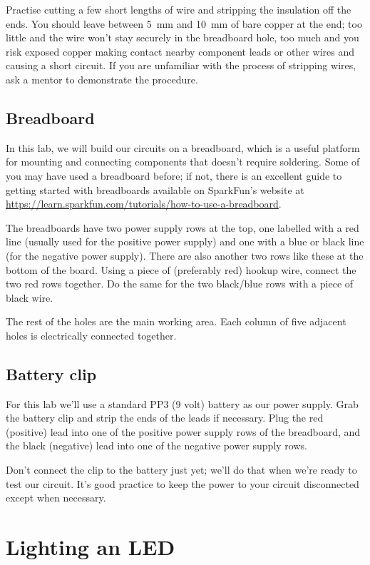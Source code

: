 \documentclass{article}
\begin{document}
Practise cutting a few short lengths of wire and stripping the insulation off
the ends. You should leave between \SI{5}{\milli\metre} and
\SI{10}{\milli\metre} of bare copper at the end; too little and the wire won't
stay securely in the breadboard hole, too much and you risk exposed copper
making contact nearby component leads or other wires and causing a short
circuit. If you are unfamiliar with the process of stripping wires, ask a
mentor to demonstrate the procedure.

\subsection{Breadboard}

In this lab, we will build our circuits on a breadboard, which is a useful
platform for mounting and connecting components that doesn't require soldering.
Some of you may have used a breadboard before; if not, there is an excellent
guide to getting started with breadboards available on SparkFun's website at
\url{https://learn.sparkfun.com/tutorials/how-to-use-a-breadboard}.

The breadboards have two power supply rows at the top, one labelled with
a red line (usually used for the positive power supply) and one with a blue or
black line (for the negative power supply). There are also another two
rows like these at the bottom of the board. Using a piece of (preferably red)
hookup wire, connect the two red rows together. Do the same for the two
black/blue rows with a piece of black wire.

The rest of the holes are the main working area. Each column of five adjacent
holes is electrically connected together.

\subsection{Battery clip}

For this lab we'll use a standard PP3 (9 volt) battery as our power supply.
Grab the battery clip and strip the ends of the leads if necessary. Plug the
red (positive) lead into one of the positive power supply rows of the
breadboard, and the black (negative) lead into one of the negative power supply
rows.

Don't connect the clip to the battery just yet; we'll do that when we're ready
to test our circuit. It's good practice to keep the power to your circuit
disconnected except when necessary.

\section{Lighting an LED}
\end{document}
